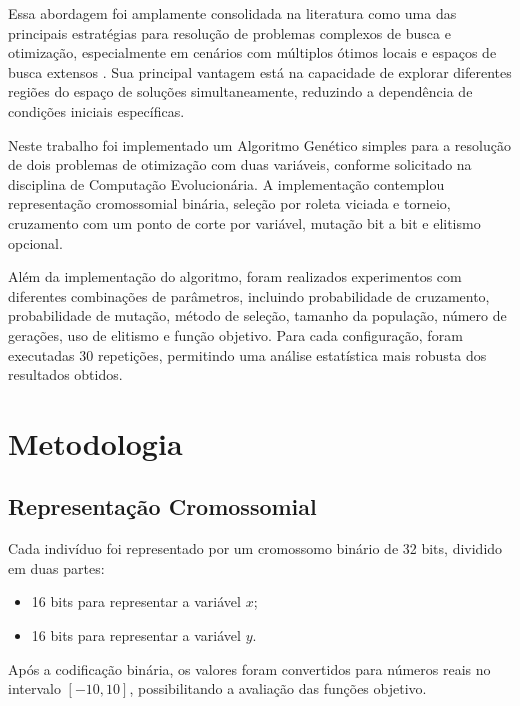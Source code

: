 \documentclass[a4paper,12pt]{article}
\begin{document}
Essa abordagem foi amplamente consolidada na literatura como uma das principais estratégias para resolução de problemas complexos de busca e otimização, especialmente em cenários com múltiplos ótimos locais e espaços de busca extensos \cite{mitchell1998}. Sua principal vantagem está na capacidade de explorar diferentes regiões do espaço de soluções simultaneamente, reduzindo a dependência de condições iniciais específicas.

Neste trabalho foi implementado um Algoritmo Genético simples para a resolução de dois problemas de otimização com duas variáveis, conforme solicitado na disciplina de Computação Evolucionária. A implementação contemplou representação cromossomial binária, seleção por roleta viciada e torneio, cruzamento com um ponto de corte por variável, mutação bit a bit e elitismo opcional.

Além da implementação do algoritmo, foram realizados experimentos com diferentes combinações de parâmetros, incluindo probabilidade de cruzamento, probabilidade de mutação, método de seleção, tamanho da população, número de gerações, uso de elitismo e função objetivo. Para cada configuração, foram executadas 30 repetições, permitindo uma análise estatística mais robusta dos resultados obtidos.


\section{Metodologia}

\subsection{Representação Cromossomial}

Cada indivíduo foi representado por um cromossomo binário de 32 bits, dividido em duas partes:

\begin{itemize}
    \item 16 bits para representar a variável $x$;
    \item 16 bits para representar a variável $y$.
\end{itemize}

Após a codificação binária, os valores foram convertidos para números reais no intervalo $[-10,10]$, possibilitando a avaliação das funções objetivo.
\end{document}
